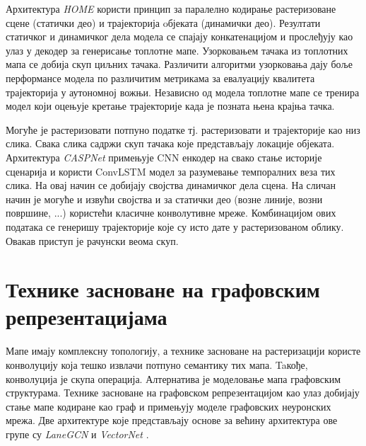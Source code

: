 \documentclass[11pt,oneside]{memoir}
\begin{document}
Архитектура \textit{HOME} \cite{home} користи принцип за паралелно кодирање растеризоване сцене (статички део)
и трајекторија oбјеката (динамички део). Резултати
статичког и динамичког дела модела се спајају конкатенацијом и прослеђују као улаз у декодер за генерисање топлотне мапе. 
Узорковањем тачака из топлотних мапа се добија скуп циљних тачака. Различити алгоритми узорковања дају
боље перформансе модела по различитим метрикама за евалуацију квалитета трајекторија у аутономној вожњи. Независно од модела топлотне мапе
се тренира модел који оцењује кретање трајекторије када је позната њена крајња тачка.

Могуће је растеризовати потпуно податке тј. растеризовати и трајекторије као низ слика. Свака слика садржи скуп тачака које представљају
локације објеката. Архитектура \textit{CASPNet} \cite{caspnet} примењује CNN енкодер на свако стање историје сценарија 
и користи ConvLSTM \cite{convlstm} модел за разумевање
темпоралних веза тих слика. На овај начин се добијају својства динамичког дела сцена. 
На сличан начин је могуће и извући својства и за 
статички део (возне линије, возни површине, ...) користећи класичне конволутивне мреже. Комбинацијом ових података се генеришу
трајекторије које су исто дате у растеризованом облику. Овакав приступ је рачунски веома скуп.

\section{Технике засноване на графовским репрезентацијама}

Мапе имају комплексну топологију, а технике засноване на растеризацији користе конволуцију која тешко 
извлачи потпуно семантику тих мапа. Taкође, конволуција је скупа операција. Алтернатива је моделовање мапа графовским структурама. 
Технике засноване на графовском репрезентацијом као улаз добијају стање мапе кодиране као граф и примењују моделе графовских неуронских мрежа. 
Две архитектуре које представљају основе за већину архитектура ове групе су \textit{LaneGCN} \cite{lanegcn} и \textit{VectorNet} \cite{vectornet}.
\end{document}
